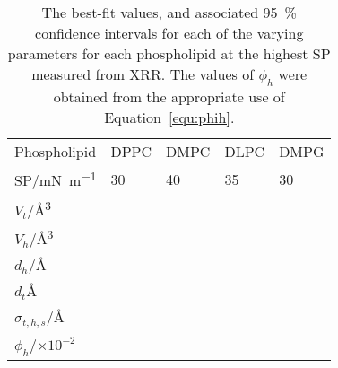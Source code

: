 %
%
\begin{sidewaystable}
    \centering
    \small
    \caption{The best-fit values, and associated \SI{95}{\percent} confidence intervals for each of the varying parameters for each phospholipid at the highest SP measured from XRR. The values of $\phi_h$ were obtained from the appropriate use of Equation~\protect\ref{equ:phih}.}
    \label{tab:xrrref4}
    \begin{tabular}{l | l l l l}
        \toprule
        Phospholipid & DPPC & DMPC & DLPC & DMPG \\
        SP/\si{\milli\newton\per\meter} & 30 & 40 & 35 & 30 \\
        \midrule
        $V_t$/\si{\angstrom\cubed} &  &  &  &  \\
        $V_h$/\si{\angstrom\cubed} &  &  &  &  \\
        $d_h$/\si{\angstrom} &  &  &  &  \\
        \midrule
        $d_t$\si{\angstrom} &  &  &  &  \\
        $\sigma_{t,h,s}$/\si{\angstrom} &  &  &  &  \\
        \midrule
        $\phi_h$/$\times 10^{-2}$ &  &  &  &  \\
        \bottomrule
    \end{tabular}
\end{sidewaystable}

